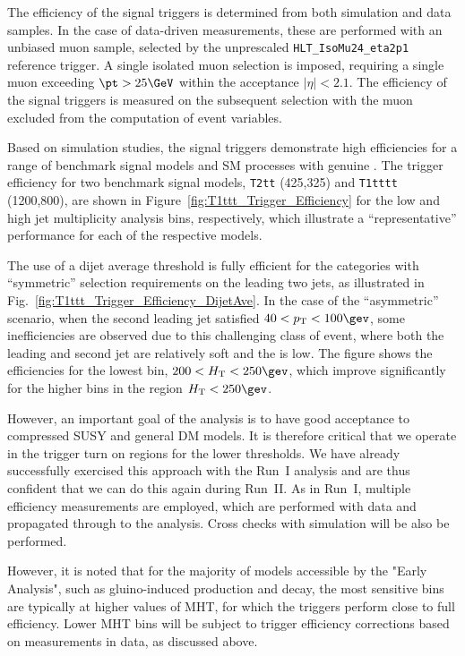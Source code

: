 The efficiency of the signal triggers is determined from both
simulation and data samples. In the case of data-driven measurements,
these are performed with an unbiased muon sample, selected by the
unprescaled \verb!HLT_IsoMu24_eta2p1! reference trigger. A single
isolated muon selection is imposed, requiring a single muon exceeding
$\pt > 25 \GeV$ within the acceptance $|\eta| < 2.1$. The efficiency
of the signal triggers is measured on the subsequent selection with
the muon excluded from the computation of event variables.

Based on simulation studies, the signal triggers demonstrate high
efficiencies for a range of benchmark signal models and SM processes
with genuine \met. The trigger efficiency for two benchmark signal
models, \texttt{T2tt} (425,325) and \texttt{T1tttt} (1200,800), are
shown in Figure~\ref{fig:T1ttt_Trigger_Efficiency} for the low and
high jet multiplicity analysis bins, respectively, which illustrate a
``representative'' performance for each of the respective models.
  
The use of a dijet average threshold is fully efficient for the
categories with ``symmetric'' \Pt selection requirements on the
leading two jets, as illustrated in
Fig.~\ref{fig:T1ttt_Trigger_Efficiency_DijetAve}. In the case of the
``asymmetric'' scenario, when the second leading jet satisfied $40 <
\Pt < 100\gev$, some inefficiencies are observed due to this
challenging class of event, where both the leading and second jet
are relatively soft and the \scalht is low. The figure shows the
efficiencies for the lowest \scalht bin, $200 < \scalht < 250\gev$, 
which improve significantly for the higher \scalht bins in the region
$\scalht < 250\gev$. 

However, an important goal of the analysis is to have good acceptance
to compressed SUSY and general DM models. It is therefore critical
that we operate in the trigger turn on regions for the lower
thresholds. We have already successfully exercised this approach with
the Run~I analysis and are thus confident that we can do this again
during Run~II. As in Run~I, multiple efficiency measurements are
employed, which are performed with data and propagated through to the
analysis. Cross checks with simulation will be also be performed.

However, it is noted that for the majority of models accessible by the
"Early Analysis", such as gluino-induced production and decay, the
most sensitive bins are typically at higher values of MHT, for which
the triggers perform close to full efficiency. Lower MHT bins will be
subject to trigger efficiency corrections based on measurements in
data, as discussed above. 


